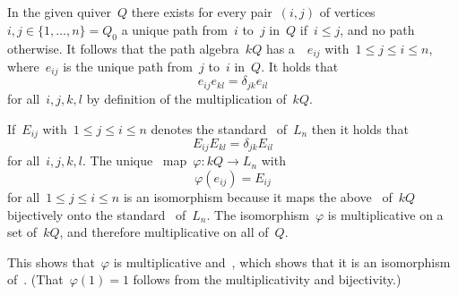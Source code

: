 \section{}

In the given quiver~$Q$ there exists for every pair~$(i,j)$ of vertices~$i,j \in \{1, \dotsc, n\} = Q_0$ a unique path from~$i$ to~$j$ in~$Q$ if~$i \leq j$, and no path otherwise.
It follows that the path algebra~$kQ$ has a~{\kbasis}~$e_{ij}$ with~$1 \leq j \leq i \leq n$, where~$e_{ij}$ is the unique path from~$j$ to~$i$ in~$Q$.
It holds that
\[
    e_{ij} e_{kl}
  = \delta_{jk} e_{il}
\]
for all~$i,j,k,l$ by definition of the multiplication of~$kQ$.

If~$E_{ij}$ with~$1 \leq j \leq i \leq n$ denotes the standard~{\kbasis} of~$L_n$ then it holds that
\[
    E_{ij} E_{kl}
  = \delta_{jk} E_{il}
\]
for all~$i,j,k,l$.
The unique~{\klin} map~$\varphi \colon kQ \to L_n$ with~
\[
    \varphi(e_{ij})
  = E_{ij}
\]
for all~$1 \leq j \leq i \leq n$ is an isomorphism because it maps the above~{\kbasis} of~$kQ$ bijectively onto the standard~{\kbasis} of~$L_n$.
The isomorphism~$\varphi$ is multiplicative on a~ set of~$kQ$, and therefore multiplicative on all of~$Q$.

This shows that~$\varphi$ is multiplicative and~{\klin}, which shows that it is an isomorphism of~{\kalgs}.
(That~$\varphi(1) = 1$ follows from the multiplicativity and bijectivity.)




